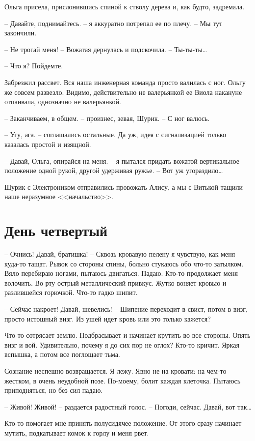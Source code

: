 \documentclass[a4paper]{book}
\begin{document}
Ольга присела, прислонившись спиной к стволу дерева и, как будто, задремала. 

-- Давайте, поднимайтесь. -- я аккуратно потрепал ее по плечу. -- Мы тут закончили.

-- Не трогай меня! -- Вожатая дернулась и подскочила. -- Ты-ты-ты\ldots

-- Что я? Пойдемте.

Забрезжил рассвет. Вся наша инженерная команда просто валилась с ног. Ольгу же совсем развезло. Видимо, действительно не валерьянкой ее Виола накануне отпаивала, однозначно не валерьянкой.

-- Заканчиваем, в общем. -- произнес, зевая, Шурик. -- С ног валюсь. 

-- Угу, ага. -- соглашались остальные. Да уж, идея с сигнализацией только казалась простой и изящной.

-- Давай, Ольга, опирайся на меня. -- я пытался придать вожатой вертикальное положение одной рукой, другой удерживая ружье. --  Вот уж угораздило\ldots 

Шурик с Электроником отправились провожать Алису, а мы с Витькой тащили наше неразумное <<начальство>>.

\chapter{День четвертый}
-- Очнись! Давай, братишка! -- Сквозь кровавую пелену я чувствую, как меня куда-то тащат. Рывок со стороны спины, больно стукаюсь обо что-то затылком. Вяло перебираю ногами, пытаюсь двигаться. Падаю. Кто-то продолжает меня волочить. Во рту острый металлический привкус.  Жутко воняет кровью и разлившейся горючкой. Что-то гадко шипит. 

-- Сейчас накроет! Давай, шевелись! -- Шипение  переходит в свист, потом в визг, просто истошный визг. Из ушей идет кровь или это только кажется? 

Что-то сотрясает землю. Подбрасывает и начинает крутить во все стороны. Опять визг и вой. Удивительно, почему я до сих пор не оглох? Кто-то кричит. Яркая вспышка, а потом все поглощает тьма.  

Сознание неспешно возвращается. Я лежу. Явно не на кровати: на чем-то жестком, в очень неудобной позе.  По-моему, болит каждая клеточка. Пытаюсь приподняться, но без сил падаю. 

-- Живой! Живой! -- раздается радостный голос. -- Погоди, сейчас. Давай, вот так\ldots

Кто-то помогает мне принять полусидячее положение. От этого сразу начинает мутить, подкатывает комок к горлу и меня рвет. 
\end{document}

